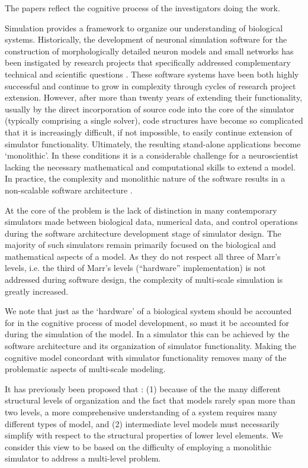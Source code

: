 \documentclass{article}
\begin{document}
The papers reflect the cognitive process of the investigators doing the work.

Simulation provides a framework to organize our understanding of biological systems. Historically, the development of neuronal simulation software for the construction of morphologically detailed neuron models and small networks has been instigated by research projects that specifically addressed complementary technical and scientific questions \cite{Moore:2010vn}. These software systems have been both highly successful and continue to grow in complexity through cycles of research project extension. However, after more than twenty years of extending their functionality, usually by the direct incorporation of source code into the core of the simulator (typically comprising a single solver), code structures have become so complicated that it is increasingly difficult, if not impossible, to easily continue extension of simulator functionality. Ultimately, the resulting stand-alone applications become `monolithic'. In these conditions it is a considerable challenge for a neuroscientist lacking the necessary mathematical and computational skills to extend a model. In practice, the complexity and monolithic nature of the software results in a non-scalable software architecture \cite{jaeger02:_comput_neuros_realis_model_exper}.

At the core of the problem is the lack of distinction in many contemporary simulators made between biological data, numerical data, and control operations during the software architecture development stage of simulator design. The majority of such simulators remain primarily focused on the biological and mathematical aspects of a model. As they do not respect all three of Marr's levels, i.e. the third of Marr's levels (``hardware'' implementation) is not addressed during software design, the complexity of multi-scale simulation is greatly increased. 

We note that just as the `hardware' of a biological system should be accounted for in the cognitive process of model development, so must it be accounted for during the simulation of the model. In a simulator this can be achieved by the software architecture and its organization of simulator functionality. Making the cognitive model concordant with simulator functionality removes many of the problematic aspects of multi-scale modeling.  

It has previously been proposed that \cite{Sejnowski:1988fk}: (1) because of the the many different structural levels of organization and the fact that models rarely span more than two levels, a more comprehensive understanding of a system requires many different types of model, and (2) intermediate level models must necessarily simplify with respect to the structural properties of lower level elements. We consider this view to be based on the difficulty of employing a monolithic simulator to address a multi-level problem.
\end{document}

